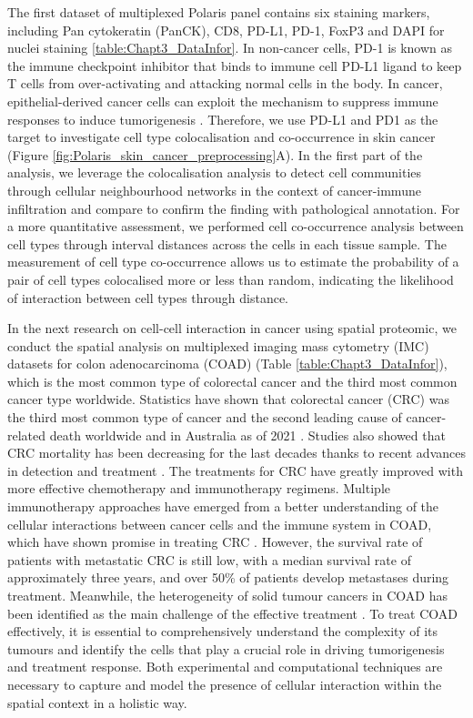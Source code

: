 The first dataset of multiplexed Polaris panel contains six staining markers, including Pan cytokeratin (PanCK), CD8, PD-L1, PD-1, FoxP3 and DAPI for nuclei staining \ref{table:Chapt3_DataInfor}. In non-cancer cells, PD-1 is known as the immune checkpoint inhibitor that binds to immune cell PD-L1 ligand to keep T cells from over-activating and attacking normal cells in the body. In cancer, epithelial-derived cancer cells can exploit the mechanism to suppress immune responses to induce tumorigenesis \cite{tsai2014pd, chen2013oncology}. Therefore, we use PD-L1 and PD1 as the target to investigate cell type colocalisation and co-occurrence in skin cancer (Figure \ref{fig:Polaris_skin_cancer_preprocessing}A). In the first part of the analysis, we leverage the colocalisation analysis to detect cell communities through cellular neighbourhood networks in the context of cancer-immune infiltration and compare to confirm the finding with pathological annotation. For a more quantitative assessment, we performed cell co-occurrence analysis between cell types through interval distances across the cells in each tissue sample. The measurement of cell type co-occurrence  allows us to estimate the probability of a pair of cell types colocalised more or less than random, indicating the likelihood of interaction between cell types through distance. 

In the next research on cell-cell interaction in cancer using spatial proteomic, we conduct the spatial analysis on multiplexed imaging mass cytometry (IMC) datasets for colon adenocarcinoma (COAD) (Table \ref{table:Chapt3_DataInfor}), which is the most common type of colorectal cancer and the third most common cancer type worldwide\cite{wang2022identification, siegel2021cancer}. Statistics have shown that colorectal cancer (CRC) was the third most common type of cancer and the second leading cause of cancer-related death worldwide and in Australia as of 2021 \cite{siegel2021cancer, aihwcoad2018statistics}. Studies also showed that CRC mortality has been decreasing for the last decades thanks to recent advances in detection and treatment \cite{ouakrim2015trends}. The treatments for CRC have greatly improved with more effective chemotherapy and immunotherapy regimens. Multiple immunotherapy approaches have emerged from a better understanding of the cellular interactions between cancer cells and the immune system in COAD, which have shown promise in treating CRC \cite{ciardiello2019immunotherapy}. However, the survival rate of patients with metastatic CRC is still low, with a median survival rate of approximately three years, and over 50\% of patients develop metastases during treatment\cite{aihwcoad2018statistics,dulskas2020improvement, spallanzani2018immunotherapy}. Meanwhile, the heterogeneity of solid tumour cancers in COAD has been identified as the main challenge of the effective treatment \cite{ciardiello2019immunotherapy, mathonnet2014hallmarks}. To treat COAD effectively, it is essential to comprehensively understand the complexity of its tumours and identify the cells that play a crucial role in driving tumorigenesis and treatment response. Both experimental and computational techniques are necessary to capture and model the presence of cellular interaction within the spatial context in a holistic way.  


